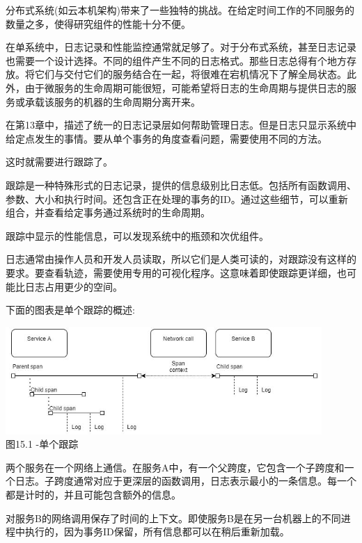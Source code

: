 
分布式系统(如云本机架构)带来了一些独特的挑战。在给定时间工作的不同服务的数量之多，使得研究组件的性能十分不便。

在单系统中，日志记录和性能监控通常就足够了。对于分布式系统，甚至日志记录也需要一个设计选择。不同的组件产生不同的日志格式。那些日志总得有个地方存放。将它们与交付它们的服务结合在一起，将很难在宕机情况下了解全局状态。此外，由于微服务的生命周期可能很短，可能希望将日志的生命周期与提供日志的服务或承载该服务的机器的生命周期分离开来。

在第13章中，描述了统一的日志记录层如何帮助管理日志。但是日志只显示系统中给定点发生的事情。要从单个事务的角度查看问题，需要使用不同的方法。

这时就需要进行跟踪了。


跟踪是一种特殊形式的日志记录，提供的信息级别比日志低。包括所有函数调用、参数、大小和执行时间。还包含正在处理的事务的ID。通过这些细节，可以重新组合，并查看给定事务通过系统时的生命周期。

跟踪中显示的性能信息，可以发现系统中的瓶颈和次优组件。

日志通常由操作人员和开发人员读取，所以它们是人类可读的，对跟踪没有这样的要求。要查看轨迹，需要使用专用的可视化程序。这意味着即使跟踪更详细，也可能比日志占用更少的空间。

下面的图表是单个跟踪的概述:

\begin{center}
\includegraphics[width=0.9\textwidth]{content/4/chapter15/images/1.jpg}\\
图15.1 -单个跟踪
\end{center}

两个服务在一个网络上通信。在服务A中，有一个父跨度，它包含一个子跨度和一个日志。子跨度通常对应于更深层的函数调用，日志表示最小的一条信息。每一个都是计时的，并且可能包含额外的信息。

对服务B的网络调用保存了时间的上下文。即使服务B是在另一台机器上的不同进程中执行的，因为事务ID保留，所有信息都可以在稍后重新加载。

